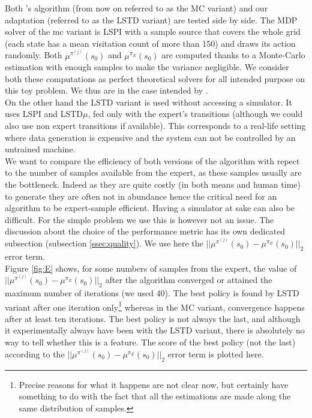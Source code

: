 \documentclass{jfpda2011}
\begin{document}
Both \citet{abbeel2004apprenticeship}'s algorithm (from now on referred to as the MC variant) and our adaptation (referred to as the LSTD variant) are tested side by side. The MDP solver of the mc variant is LSPI with a sample source that covers the whole grid (each state has a mean visitation count of more than 150) and draws its action randomly. Both $\mu^{\pi^(j)}(s_0)$ and $\mu^{\pi_E}(s_0)$ are computed thanks to a Monte-Carlo estimation with enough samples to make the variance negligible. We consider both these computations as perfect theoretical solvers for all intended purpose on this toy problem. We thus are in the case intended by \citet{abbeel2004apprenticeship}.\\
On the other hand the LSTD variant is used without accessing a simulator. It uses LSPI and LSTD$\mu$, fed only with the expert's transitions (although we could also use non expert transitions if available). This corresponds to a real-life setting where data generation is expensive and the system can not be controlled by an untrained machine.\\

We want to compare the efficiency of both versions of the algorithm with repect to the number of samples available from the expert, as these samples usually are the bottleneck. Indeed as they are quite costly (in both means and human time) to generate they are often not in abundance hence the critical need for an algorithm to be expert-sample efficient. Having a simulator at sake can also be difficult. For the simple problem we use this is however not an issue. The discussion about the choice of the performance metric has its own dedicated subsection (subsection \ref{ssec:quality}). We use here the $||\mu^{\pi^{(j)}}(s_0) - \mu^{\pi_E}(s_0)||_2$ error term.\\

Figure \ref{fig:E} shows, for some numbers of samples from the expert, the value of $||\mu^{\pi^{(j)}}(s_0)-\mu^{\pi_E}(s_0)||_2$ after the algorithm converged or attained the maximum number of iterations (we used 40). The best policy is found by LSTD variant after one iteration only\footnote{Precise reasons for what it happens are not clear now, but certainly have something to do with the fact that all the estimations are made along the same distribution of samples.} whereas in the MC variant, convergence happens after at least ten iterations. The best policy is not always the last, and although it experimentally always have been with the LSTD variant, there is absolutely no way to tell whether this is a feature. The score of the best policy (not the last) according to the $||\mu^{\pi^{(j)}}(s_0) - \mu^{\pi_E}(s_0)||_2$ error term is plotted here.\\
\end{document}
